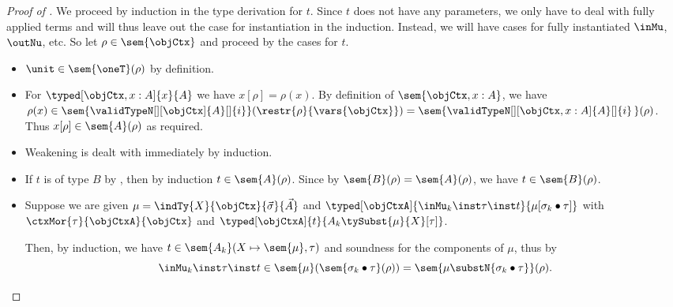 \documentclass[preprint]{sigplanconf}
\begin{document}
\begin{proof}[Proof of ]
  We proceed by induction in the type derivation for $t$.
  Since $t$ does not have any parameters, we only have to deal with fully
  applied terms and will thus leave out the case for instantiation in
  the induction.
  Instead, we will have cases for fully instantiated $\inMu$, $\outNu$, etc.
  So let $\rho \in \sem{\objCtx}$ and proceed by the cases for $t$.
  \begin{itemize}
  \item $\unit \in \sem{\oneT}(\rho)$ by definition.
  \item For $\typed[\objCtx, x : A]{x}{A}$ we have $x[\rho] = \rho(x)$.
    By definition of $\sem{\objCtx, x : A}$, we have
    $\rho(x) \in
    \sem{\validTypeN[][\objCtx]{A}[]{i}}(\restr{\rho}{\vars{\objCtx}})
    = \sem{\validTypeN[][\objCtx, x : A]{A}[]{i}\, }(\rho)$.
    Thus $x[\rho] \in \sem{A}(\rho)$ as required.
  \item Weakening is dealt with immediately by induction.
  \item If $t$ is of type $B$ by , then by
    induction $t \in \sem{A}(\rho)$.
    Since by  $\sem{B}(\rho) = \sem{A}(\rho)$,
    we have $t \in \sem{B}(\rho)$.
  \item Suppose we are given
    $\mu = \indTy{X}{\objCtx}{\vec{\sigma}}{\vec{A}}$ and
    $\typed[\objCtxA]{\inMu_k \inst \tau \inst t}{\mu [\sigma_k \bullet \tau]}$
    with $\ctxMor{\tau}{\objCtxA}{\objCtx}$ and
    $\typed[\objCtxA]{t}{A_k \tySubst{\mu}{X}[\tau]}$.

    Then, by induction, we have
    $t \in \sem{A_k}(X \mapsto \sem{\mu}, \tau)$
    and soundness for the components of $\mu$,
    thus by 
    \begin{equation*}
      \inMu_k \inst \tau \inst t \in \sem{\mu}(\sem{\sigma_k \bullet \tau}(\rho))
    = \sem{\mu \substN{\sigma_k \bullet \tau}}(\rho).
    \end{equation*}




\end{itemize}
\end{proof}
\end{document}
